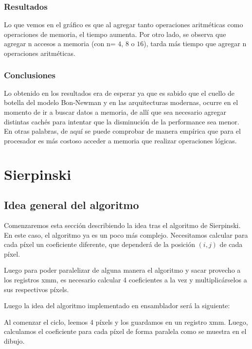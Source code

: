\documentclass[a4paper]{article}
\begin{document}
\subsubsection{Resultados}
Lo que vemos en el gráfico es que al agregar tanto operaciones aritméticas como operaciones de memoria, el tiempo aumenta. Por otro lado, se observa que agregar n accesos a memoria (con n= $4$, $8$ o $16$), tarda más tiempo que agregar n operaciones aritméticas.

\subsubsection{Conclusiones}

Lo obtenido en los resultados era de esperar ya que es sabido que el cuello de botella del modelo Bon-Newman y en las arquitecturas modernas, ocurre en el momento de ir a buscar datos a memoria, de allí que sea necesario agregar distintas cachés para intentar que la disminución de la performance sea menor. En otras palabras, de aquí se puede comprobar de manera empírica que para el procesador es más costoso acceder a memoria que realizar operaciones lógicas. 

\newpage
\section{Sierpinski}

\subsection{Idea general del algoritmo}

Comenzaremos esta sección describiendo la idea tras el algoritmo de Sierpinski. En este caso, el algoritmo ya es un poco más complejo. Necesitamos calcular para cada píxel un coeficiente diferente, que dependerá de la posición $(i,j)$ de cada píxel.

Luego para poder paralelizar de alguna manera el algoritmo y sacar provecho a los registros xmm, es necesario calcular 4 coeficientes a la vez y multiplicárselos a sus respectivos píxels.

Luego la idea del algoritmo implementado en ensamblador será la siguiente:

Al comenzar el ciclo, leemos 4 píxels y los guardamos en un registro xmm. Luego, calculamos el coeficiente para cada píxel de forma paralela como se muestra en el dibujo.
\end{document}
